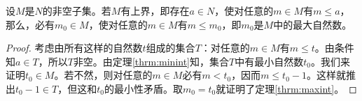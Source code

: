 \begin{theorem}[最大自然数原理]\label{thrm:maxint}
	设$M$是$N$的非空子集。若$M$有上界，即存在$a\in N$，使对任意的$m \in M$有$m \le a$，那么，必有$m_0 \in M$，使对任意的$m
		\in M$有$m \le m_0$，即$m_0$是$M$中的最大自然数。
\end{theorem}

\begin{proof}
	考虑由所有这样的自然数$t$组成的集合$T$：对任意的$m \in M$有$m \le t$。由条件知$a \in
	T$，所以$T$非空。由定理\ref{thrm:minint}知，集合$T$中有最小自然数$t_0$。我们来证明$t_0 \in
	M$。若不然，则对任意的$m\in M$必有$m < t_0$，因而$m\le t_0 -1$。这样就推出$t_0 -1\in
	T$，但这和$t_0$的最小性矛盾。取$m_0 = t_0$就证明了定理\ref{thrm:maxint}。
\end{proof}
